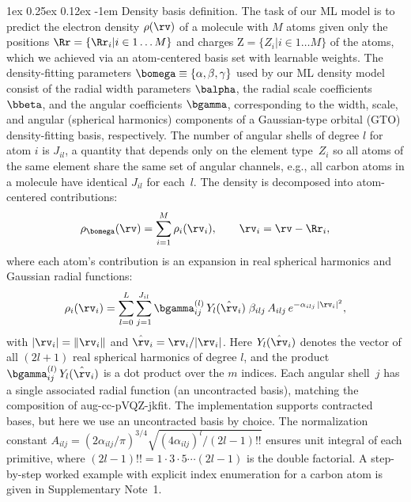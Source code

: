 \documentclass[12pt]{article}
\makeatletter
\renewcommand\paragraph{\@startsection{paragraph}{4}{\parindent}%
  {1ex \@plus 0.25ex \@minus 0.12ex}%
  {-1em}%
  {\normalfont\normalsize\itshape}}
\makeatother
\begin{document}
\paragraph{Density basis definition.}\label{sec:ml_dens_basis}
The task of our ML model is to predict the electron density $\rho(\rv)$ of a molecule with $M$ atoms given only the positions $\Rr = \{\Rr_i | i \in 1\dots M\}$ and charges $\mathrm{Z} = \{Z_i | i \in 1\dots M\}$ of the atoms, which we achieved via an atom-centered basis set with learnable weights. 
The density-fitting parameters
$\bomega \equiv \{\alpha,\beta,\gamma\}$ used by our ML density model consist of the radial width parameters $\balpha$, the radial scale coefficients $\bbeta$, and the angular coefficients $\bgamma$, corresponding to the width, scale, and angular (spherical harmonics) components of a Gaussian-type orbital (GTO) density-fitting basis, respectively. The number of angular shells of degree $l$ for atom $i$ is $J_{il}$, a quantity that depends only on the element type~$Z_i$ so all atoms of the same element share the same set of angular channels, e.g., all carbon atoms in a molecule have identical $J_{il}$ for each~$l$. The density is decomposed into atom-centered contributions:
\begin{equation}\label{eq:ml_basis_def}
  \rho_{\bomega}(\rv) = \sum_{i=1}^{M}\rho_i(\rv_i),\qquad \rv_i = \rv - \Rr_i,
\end{equation}
where each atom's contribution is an expansion in real spherical harmonics and Gaussian radial functions:
\begin{equation}\label{eq:atom_density}
  \rho_i(\rv_i) = \sum_{l=0}^{L}\sum_{j=1}^{J_{il}} \bgamma_{ij}^{(l)}\,Y_l(\hat{\rv}_i)\;\beta_{ilj}\,A_{ilj}\,e^{-\alpha_{ilj}\,|\rv_i|^2},
\end{equation}
with $|\rv_i| = \lVert\rv_i\rVert$ and $\hat{\rv}_i = \rv_i/|\rv_i|$. Here $Y_l(\hat{\rv}_i)$ denotes the vector of all $(2l+1)$ real spherical harmonics of degree $l$, and the product $\bgamma^{(l)}_{ij}\,Y_{l}(\hat{\rv}_i)$ is a dot product over the $m$ indices. Each angular shell~$j$ has a single associated radial function (an uncontracted basis), matching the composition of aug-cc-pVQZ-jkfit. The implementation supports contracted bases, but here we use an uncontracted basis by choice. The normalization constant $A_{ilj} = (2\alpha_{ilj}/\pi)^{3/4}\sqrt{(4\alpha_{ilj})^l/(2l-1)!!}$ ensures unit integral of each primitive, where $(2l-1)!! = 1 \cdot 3 \cdot 5 \cdots (2l-1)$ is the double factorial. A step-by-step worked example with explicit index enumeration for a carbon atom is given in Supplementary Note~1.
\end{document}
